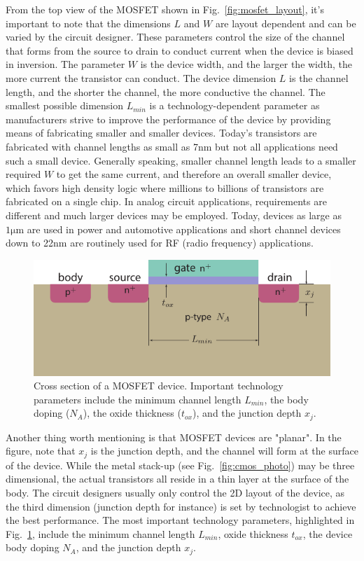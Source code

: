 From the top view of the MOSFET shown in Fig.~\ref{fig:mosfet_layout}, it's important to note that the dimensions $L$ and $W$ are layout dependent and can be varied by the circuit designer.  These parameters control the size of the channel that forms from the source to drain to conduct current when the device is biased in inversion.  The parameter $W$ is the device width, and the larger the width, the more current the transistor can conduct.  The device dimension $L$ is the channel length, and  the shorter the channel, the more conductive the channel.  The smallest possible dimension $L_{min}$ is a technology-dependent parameter as manufacturers strive to improve the performance of the device by providing means of fabricating smaller and smaller devices.  Today's transistors are fabricated with channel lengths as small as 7nm but not all applications need such a small device.  Generally speaking, smaller channel length leads to a smaller required $W$ to get the same current, and therefore an overall smaller device, which favors high density logic where millions to billions of transistors are fabricated on a single chip.  In analog circuit applications, requirements are different and much larger devices may be employed.  Today, devices as large as $1\mathrm{\mu m}$ are used in power and automotive applications and short channel devices down to 22nm are routinely used for RF (radio frequency) applications.  
\begin{figure}[tb]
\centering
\includegraphics[width=.75\columnwidth]{mos_tech}
\caption{Cross section of a MOSFET device. Important technology parameters include the minimum channel length $L_{min}$, the body doping ($N_A$), the oxide thickness ($t_{ox}$), and the junction depth $x_j$.}
\label{fig:mos_tech}
\end{figure}
Another thing worth mentioning is that MOSFET devices are "planar".  In the figure, note that $x_j$ is the junction depth, and the channel will form at the surface of the device.  While the metal stack-up (see Fig.~\ref{fig:cmos_photo}) may be three dimensional, the actual transistors all reside in a thin layer at the surface of the body.  The circuit designers usually only control the 2D layout of the device, as the third dimension (junction depth for instance) is set by technologist to achieve the best performance.  The most important technology parameters, highlighted in Fig.~\ref{fig:mos_tech}, include the minimum channel length $L_{min}$, oxide thickness $t_{ox}$, the device body doping $N_A$, and the junction depth $x_j$.
